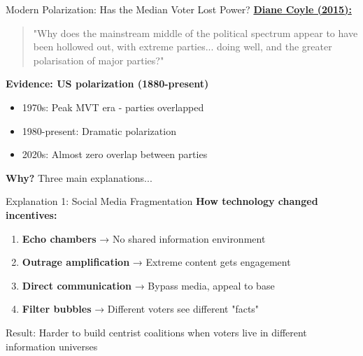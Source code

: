 \documentclass[10pt]{beamer}
\begin{document}
\begin{frame}{Modern Polarization: Has the Median Voter Lost Power?}
\href{https://www.ft.com/content/7ab73ad8-21ec-39f3-ab8d-a559a110d210}{\alert{\textbf{Diane Coyle (2015):}}}

\begin{quote}
"Why does the mainstream middle of the political spectrum appear to have been hollowed out, with extreme parties... doing well, and the greater polarisation of major parties?"
\end{quote}



\textbf{Evidence: US polarization (1880-present)}
\begin{itemize}
\item 1970s: Peak MVT era - parties overlapped
\item 1980-present: \alert{Dramatic polarization}
\item 2020s: Almost zero overlap between parties
\end{itemize}



\textbf{Why?} Three main explanations...
\end{frame}

\begin{frame}{Explanation 1: Social Media Fragmentation}
\textbf{How technology changed incentives:}


\begin{enumerate}
\item \textbf{Echo chambers} → No shared information environment
\item \textbf{Outrage amplification} → Extreme content gets engagement
\item \textbf{Direct communication} → Bypass media, appeal to base
\item \textbf{Filter bubbles} → Different voters see different "facts"
\end{enumerate}



\alert{Result:} Harder to build centrist coalitions when voters live in different information universes
\end{frame}
\end{document}
